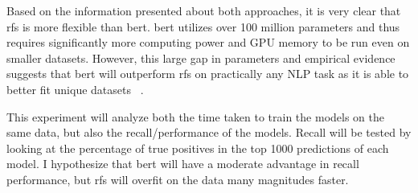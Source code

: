 Based on the information presented about both approaches, it is very clear that \acrlong{rfs} is more flexible than \acrshort{bert}. \acrshort{bert} utilizes over 100 million parameters and thus requires significantly more computing power and GPU memory to be run even on smaller datasets. However, this large gap in parameters and empirical evidence suggests that \acrshort{bert} will outperform \gls{rfs} on practically any NLP task as it is able to better fit unique datasets ~\parencite{devlin2019bert:}.

This experiment will analyze both the time taken to train the models on the same data, but also the recall/performance of the models. Recall will be tested by looking at the percentage of true positives in the top 1000 predictions of each model. I hypothesize that \acrshort{bert} will have a moderate advantage in recall performance, but \acrshort{rfs} will overfit on the data many magnitudes faster.